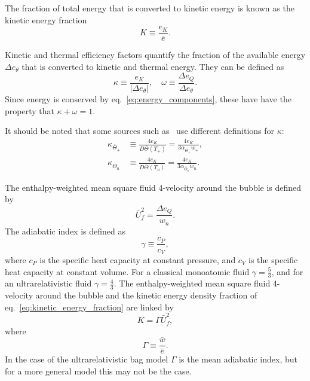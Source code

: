The fraction of total energy that is converted to kinetic energy is known as the kinetic energy fraction
\begin{equation}
K \equiv \frac{e_K}{\bar{e}}.
\label{eq:kinetic_energy_fraction}
\end{equation}

Kinetic and thermal efficiency factors quantify the fraction of the available energy $\Delta e_\theta$
that is converted to kinetic and thermal energy.
They can be defined as
\begin{equation}
\kappa \equiv \frac{e_K}{| \Delta e_\theta |}, \quad
\omega \equiv \frac{\Delta e_Q}{\Delta e_\theta}.
\label{eq:kappa_omega}
\end{equation}
Since energy is conserved by eq.~\eqref{eq:energy_components},
these have have the property that $\kappa + \omega = 1$.

It should be noted that some sources such as~\cites[eq. 36]{giese_2020}[eq. 12, 14]{giese_2021}
use different definitions for $\kappa$:
\begin{align}
\kappa_{\bar{\Theta}_+} &\equiv \frac{4 e_K}{D \bar{\Theta}(T_+)} = \frac{4 e_K}{3 \alpha_{\bar{\Theta}_+} w_+},
\label{eq:kappa_thetabar_plus} \\
\kappa_{\bar{\Theta}_n} &\equiv \frac{4 e_K}{D \bar{\Theta}(T_n)} = \frac{4 e_K}{3 \alpha_{\bar{\Theta}_n} w_n}.
\label{eq:kappa_thetabar_n}
\end{align}

The enthalpy-weighted mean square fluid 4-velocity around the bubble is defined by
\begin{equation}
\bar{U}_f^2 = \frac{\Delta e_Q}{w_n}.
\label{eq:ubarf2}
\end{equation}
The adiabatic index is defined as
\begin{equation}
\gamma \equiv \frac{c_P}{c_V},
\end{equation}
where $c_P$ is the specific heat capacity at constant pressure,
and $c_V$ is the specific heat capacity at constant volume.
For a classical monoatomic fluid $\gamma = \frac{5}{3}$,
and for an ultrarelativistic fluid $\gamma = \frac{4}{3}$.
The enthalpy-weighted mean square fluid 4-velocity around the bubble and
the kinetic energy density fraction of eq.~\eqref{eq:kinetic_energy_fraction} are linked by
\begin{equation}
K = \Gamma \bar{U}_f^2,
\label{eq:kinetic_energy_fraction2}
\end{equation}
where
\begin{equation}
\Gamma \equiv \frac{\bar{w}}{\bar{e}}.
\label{eq:mean_adiabatic_index}
\end{equation}
In the case of the ultrarelativistic bag model $\Gamma$ is the mean adiabatic index,
but for a more general model this may not be the case.
